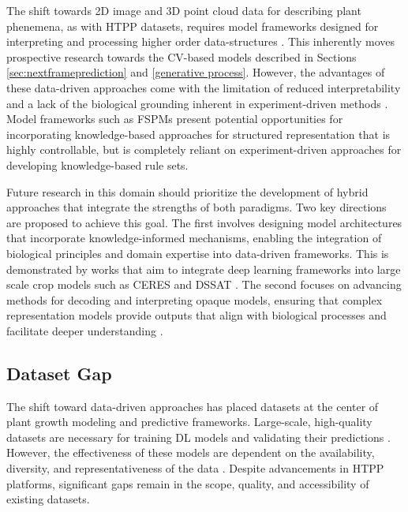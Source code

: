 \documentclass{article}
\begin{document}
The shift towards 2D image and 3D point cloud data for describing plant phenemena, as with HTPP datasets, requires model frameworks designed for interpreting and processing higher order data-structures \cite{harandi2023make,tpj.17053}. 
This inherently moves prospective research towards the CV-based models described in Sections \ref{sec:nextframeprediction} and \ref{generative process}. However, the advantages of these data-driven approaches come with the limitation of reduced interpretability and a lack of the biological grounding inherent in experiment-driven methods \cite{mostafa2023explainable}. 
Model frameworks such as FSPMs present potential opportunities for incorporating knowledge-based approaches for structured representation that is highly controllable, but is completely reliant on experiment-driven approaches for developing knowledge-based rule sets.

Future research in this domain should prioritize the development of hybrid approaches that integrate the strengths of both paradigms. 
Two key directions are proposed to achieve this goal. The first involves designing model architectures that incorporate knowledge-informed mechanisms, enabling the integration of biological principles and domain expertise into data-driven frameworks. 
This is demonstrated by works that aim to integrate deep learning frameworks into large scale crop models such as CERES and DSSAT \cite{shi2025deep}. The second focuses on advancing methods for decoding and interpreting opaque models, ensuring that complex representation models provide outputs that align with biological processes and facilitate deeper understanding \cite{mostafa2023explainable}.


\subsection{Dataset Gap}

The shift toward data-driven approaches has placed datasets at the center of plant growth modeling and predictive frameworks. 
Large-scale, high-quality datasets are necessary for training DL models and validating their predictions \cite{xu2023embracing,kiab301}. 
However, the effectiveness of these models are dependent on the availability, diversity, and representativeness of the data \cite{LI2023108412}. 
Despite advancements in HTPP platforms, significant gaps remain in the scope, quality, and accessibility of existing datasets. 
\end{document}
